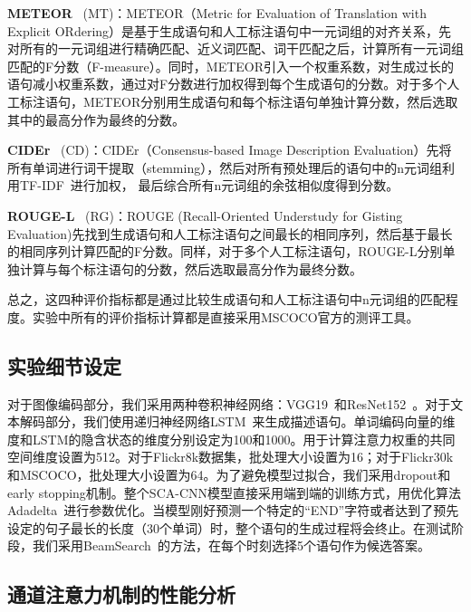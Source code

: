 \textbf{METEOR}~\cite{banerjee2005meteor} (MT)：METEOR（Metric for Evaluation of Translation with Explicit ORdering）是基于生成语句和人工标注语句中一元词组的对齐关系，先对所有的一元词组进行精确匹配、近义词匹配、词干匹配之后，计算所有一元词组匹配的F分数（F-measure）。同时，METEOR引入一个权重系数，对生成过长的语句减小权重系数，通过对F分数进行加权得到每个生成语句的分数。对于多个人工标注语句，METEOR分别用生成语句和每个标注语句单独计算分数，然后选取其中的最高分作为最终的分数。

\textbf{CIDEr}~\cite{vedantam2015cider} (CD)：CIDEr（Consensus-based Image Description Evaluation）先将所有单词进行词干提取（stemming），然后对所有预处理后的语句中的n元词组利用TF-IDF~\cite{robertson2004understanding}进行加权，
最后综合所有n元词组的余弦相似度得到分数。

\textbf{ROUGE-L}~\cite{lin2002manual} (RG)：ROUGE (Recall-Oriented Understudy for Gisting Evaluation)先找到生成语句和人工标注语句之间最长的相同序列，然后基于最长的相同序列计算匹配的F分数。同样，对于多个人工标注语句，ROUGE-L分别单独计算与每个标注语句的分数，然后选取最高分作为最终分数。

总之，这四种评价指标都是通过比较生成语句和人工标注语句中n元词组的匹配程度。实验中所有的评价指标计算都是直接采用MSCOCO官方的测评工具。


\subsection{实验细节设定}
对于图像编码部分，我们采用两种卷积神经网络：VGG19~\cite{simonyan2015very}和ResNet152~\cite{he2016deep}。对于文本解码部分，我们使用递归神经网络LSTM~\cite{hochreiter1997long}来生成描述语句。单词编码向量的维度和LSTM的隐含状态的维度分别设定为100和1000。用于计算注意力权重的共同空间维度设置为512。对于Flickr8k数据集，批处理大小设置为16；对于Flickr30k和MSCOCO，批处理大小设置为64。为了避免模型过拟合，我们采用dropout和early stopping机制。整个SCA-CNN模型直接采用端到端的训练方式，用优化算法Adadelta~\cite{zeiler2012adadelta}进行参数优化。当模型刚好预测一个特定的“END”字符或者达到了预先设定的句子最长的长度（30个单词）时，整个语句的生成过程将会终止。在测试阶段，我们采用BeamSearch~\cite{vinyals2015show}的方法，在每个时刻选择5个语句作为候选答案。


\subsection{通道注意力机制的性能分析}

